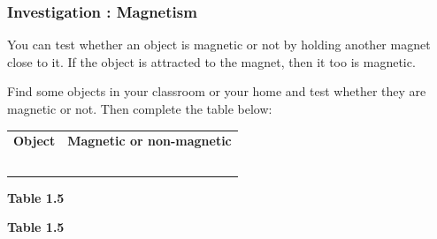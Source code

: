             \subsubsection{  Investigation : Magnetism
      }
            \nopagebreak
      \label{m38706*id67220}You can test whether an object is magnetic or not by holding another magnet close to it. If the object is attracted to the magnet, then it too is magnetic.\par 
      \label{m38706*id67227}Find some objects in your classroom or your home and test whether they are magnetic or not. Then complete the table below:\par 
          \begin{table}[H]
        \begin{center}
      \label{m38706*id67234}
    \noindent
      \tablelasttail{}
      \begin{xtabular}[t]{|l|l|}\hline
                \textbf{Object}
               &
                \textbf{Magnetic or non-magnetic}
     \tabularnewline{}
         &
     \tabularnewline{}
         &
     \tabularnewline{}
         &
     \tabularnewline{}
         &
     \tabularnewline{}
         &
     \tabularnewline{}
    \end{xtabular}
      \end{center}
    \begin{center}{\small\bfseries Table 1.5}\end{center}
    \begin{caption}{\small\bfseries Table 1.5}\end{caption}
\end{table}
    \par
\label{m38706*secfhsst!!!underscore!!!id616}
